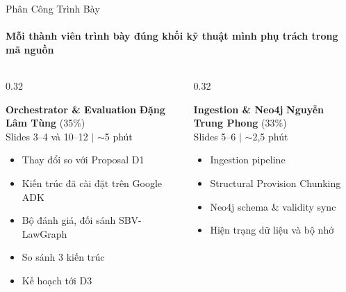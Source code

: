 \documentclass[aspectratio=1610,10pt,xcolor={table}]{beamer}
\begin{document}
\begin{frame}{Phân Công Trình Bày}
  \framesubtitle{Mỗi thành viên trình bày đúng khối kỹ thuật mình phụ trách trong mã nguồn}

  \begin{columns}[t]
    \begin{column}{0.32\textwidth}
      \begin{block}{\textbf{Orchestrator \& Evaluation}}
        {\small\textbf{Đặng Lâm Tùng}} {\footnotesize (35\%)}\\
        {\footnotesize Slides 3--4 và 10--12 $\vert$ $\sim$5 phút}\\[0.08cm]
        \begin{itemize}\footnotesize
          \item Thay đổi so với Proposal D1
          \item Kiến trúc đã cài đặt trên Google ADK
          \item Bộ đánh giá, đối sánh SBV-LawGraph
          \item So sánh 3 kiến trúc
          \item Kế hoạch tới D3
        \end{itemize}
      \end{block}
    \end{column}

    \begin{column}{0.32\textwidth}
      \begin{block}{\textbf{Ingestion \& Neo4j}}
        {\small\textbf{Nguyễn Trung Phong}} {\footnotesize (33\%)}\\
        {\footnotesize Slides 5--6 $\vert$ $\sim$2,5 phút}\\[0.08cm]
        \begin{itemize}\footnotesize
          \item Ingestion pipeline
          \item Structural Provision Chunking
          \item Neo4j schema \& validity sync
          \item Hiện trạng dữ liệu và bộ nhớ
        \end{itemize}
      \end{block}
    \end{column}


\end{columns}
\end{frame}
\end{document}
